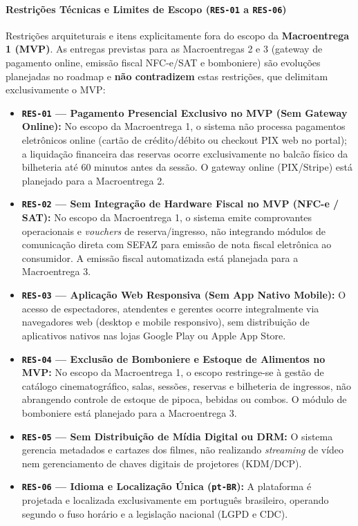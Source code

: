 \paragraph{\texorpdfstring{Restrições Técnicas e Limites de Escopo (\texttt{RES-01} a \texttt{RES-06})}{Restrições Técnicas e Limites de Escopo (RES-01 a RES-06)}}

Restrições arquiteturais e itens explicitamente fora do escopo da \textbf{Macroentrega 1 (MVP)}. As entregas previstas para as Macroentregas 2 e 3 (gateway de pagamento online, emissão fiscal NFC-e/SAT e bomboniere) são evoluções planejadas no roadmap e \textbf{não contradizem} estas restrições, que delimitam exclusivamente o MVP:

\begin{itemize}
\item \textbf{\texttt{RES-01} — Pagamento Presencial Exclusivo no MVP (Sem Gateway Online):} No escopo da Macroentrega 1, o sistema não processa pagamentos eletrônicos online (cartão de crédito/débito ou checkout PIX web no portal); a liquidação financeira das reservas ocorre exclusivamente no balcão físico da bilheteria até 60 minutos antes da sessão. O gateway online (PIX/Stripe) está planejado para a Macroentrega 2.
\item \textbf{\texttt{RES-02} — Sem Integração de Hardware Fiscal no MVP (NFC-e / SAT):} No escopo da Macroentrega 1, o sistema emite comprovantes operacionais e \emph{vouchers} de reserva/ingresso, não integrando módulos de comunicação direta com SEFAZ para emissão de nota fiscal eletrônica ao consumidor. A emissão fiscal automatizada está planejada para a Macroentrega 3.
\item \textbf{\texttt{RES-03} — Aplicação Web Responsiva (Sem App Nativo Mobile):} O acesso de espectadores, atendentes e gerentes ocorre integralmente via navegadores web (desktop e mobile responsivo), sem distribuição de aplicativos nativos nas lojas Google Play ou Apple App Store.
\item \textbf{\texttt{RES-04} — Exclusão de Bomboniere e Estoque de Alimentos no MVP:} No escopo da Macroentrega 1, o escopo restringe-se à gestão de catálogo cinematográfico, salas, sessões, reservas e bilheteria de ingressos, não abrangendo controle de estoque de pipoca, bebidas ou combos. O módulo de bomboniere está planejado para a Macroentrega 3.
\item \textbf{\texttt{RES-05} — Sem Distribuição de Mídia Digital ou DRM:} O sistema gerencia metadados e cartazes dos filmes, não realizando \emph{streaming} de vídeo nem gerenciamento de chaves digitais de projetores (KDM/DCP).
\item \textbf{\texttt{RES-06} — Idioma e Localização Única (\texttt{pt-BR}):} A plataforma é projetada e localizada exclusivamente em português brasileiro, operando segundo o fuso horário e a legislação nacional (LGPD e CDC).
\end{itemize}

